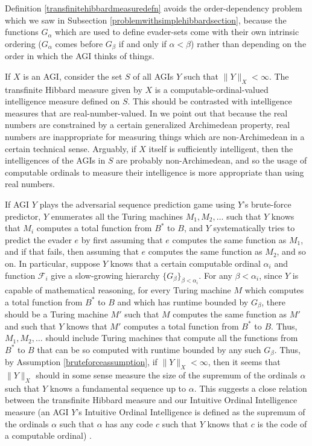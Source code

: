 \documentclass{article}
\begin{document}
Definition \ref{transfinitehibbardmeasuredefn} avoids the order-dependency problem which
we saw in Subsection \ref{problemwithsimplehibbardsection}, because the functions
$G_{\alpha}$ which are used to define evader-sets come with their own intrinsic ordering
($G_{\alpha}$ comes before $G_{\beta}$ if and only if $\alpha<\beta$) rather than
depending on the order in which the AGI thinks of things.

If $X$ is an AGI, consider the set $S$ of all AGIs $Y$ such that $\|Y\|_X<\infty$.
The transfinite Hibbard measure given by $X$ is a computable-ordinal-valued intelligence
measure defined on $S$. This should be contrasted with intelligence measures that
are real-number-valued. In \cite{alexander2020archimedean} we point out that because
the real numbers are constrained by a certain generalized Archimedean property,
real numbers are inappropriate for measuring things which are non-Archimedean in a certain
technical sense. Arguably, if $X$ itself is sufficiently intelligent, then
the intelligences of the AGIs in $S$ are probably non-Archimedean, and so the usage of
computable ordinals to measure their intelligence is more appropriate than using real numbers.

If AGI $Y$ plays the adversarial sequence prediction game using $Y$'s brute-force
predictor, $Y$ enumerates all the Turing machines $M_1,M_2,\ldots$ such that $Y$ knows that
$M_i$ computes a total function from $B^*$ to $B$, and $Y$ systematically tries to
predict the evader $e$ by first assuming that $e$ computes the same function as
$M_1$, and if that fails, then assuming that $e$ computes the same function as
$M_2$, and so on. In particular, suppose $Y$ knows that a certain computable ordinal
$\alpha_i$ and function $\mathcal F_i$ give a slow-growing hierarchy
$\{G_\beta\}_{\beta<\alpha_i}$. For any $\beta<\alpha_i$,
since $Y$ is capable of mathematical reasoning, for every Turing machine $M$
which computes a total function from $B^*$ to $B$ and which has runtime bounded by
$G_\beta$, there should be a Turing machine $M'$ such that $M$ computes the same
function as $M'$ and such that $Y$ knows that $M'$ computes a total function from $B^*$
to $B$. Thus, $M_1,M_2,\ldots$ should include Turing machines that compute all the
functions from $B^*$ to $B$ that can be so computed with runtime bounded by any such
$G_\beta$. Thus, by Assumption \ref{bruteforceassumption}, if
$\|Y\|_X<\infty$, then it seems that $\|Y\|_X$ should in some sense measure the size
of the supremum of the ordinals $\alpha$ such that $Y$ knows a fundamental sequence up
to $\alpha$. This suggests a close relation between the transfinite Hibbard measure and
our Intuitive Ordinal Intelligence measure (an AGI $Y$'s Intuitive Ordinal Intelligence is
defined as the supremum of the ordinals $\alpha$ such that $\alpha$ has any code
$c$ such that $Y$ knows that $c$ is the code of a computable ordinal)
\cite{ioi1} \cite{ioi2}.
\end{document}
